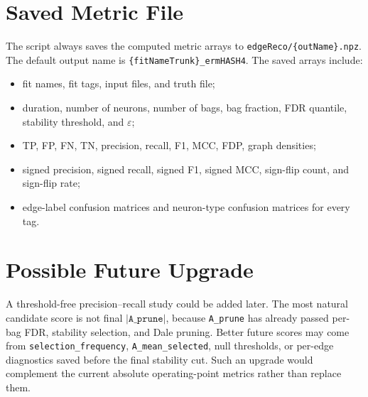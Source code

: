 \documentclass[11pt]{article}
\begin{document}
\section{Saved Metric File}
\label{sec:output}

The script always saves the computed metric arrays to
\texttt{edgeReco/\{outName\}.npz}. The default output name is
\texttt{\{fitNameTrunk\}\_ermHASH4}. The saved arrays include:
\begin{itemize}
  \item fit names, fit tags, input files, and truth file;
  \item duration, number of neurons, number of bags, bag fraction, FDR
  quantile, stability threshold, and \(\varepsilon\);
  \item TP, FP, FN, TN, precision, recall, F1, MCC, FDP, graph densities;
  \item signed precision, signed recall, signed F1, signed MCC, sign-flip
  count, and sign-flip rate;
  \item edge-label confusion matrices and neuron-type confusion matrices for
  every tag.
\end{itemize}

\section{Possible Future Upgrade}
\label{sec:future}

A threshold-free precision--recall study could be added later. The most
natural candidate score is not final \(|\texttt{A\_prune}|\), because
\texttt{A\_prune} has already passed per-bag FDR, stability selection, and
Dale pruning. Better future scores may come from \texttt{selection\_frequency},
\texttt{A\_mean\_selected}, null thresholds, or per-edge diagnostics saved
before the final stability cut. Such an upgrade would complement the current
absolute operating-point metrics rather than replace them.
\end{document}
